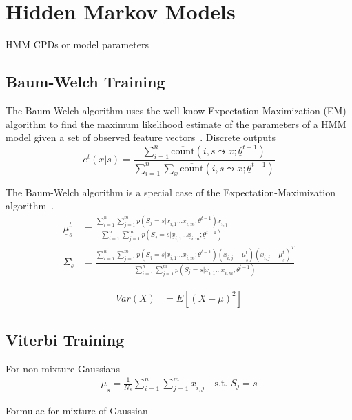 \chapter{Hidden Markov Models}\label{app:hmm}
HMM CPDs or model parameters

\section{Baum-Welch Training}
The Baum-Welch algorithm uses the well know Expectation Maximization (EM)
algorithm to find the maximum likelihood estimate of the parameters of a
HMM model given a set of observed feature vectors~\cite{baum-welch14}. Discrete
outputs
\begin{equation}
e^t(x|s) = \frac{\sum_{i=1}^n \overline{\text{count}}(i, s\leadsto x;
\underline{\theta}^{t-1})}{\sum_{i=1}^n \sum_x \overline{\text{count}}(i,
s\leadsto x;
\underline{\theta}^{t-1})}
\end{equation}

The Baum-Welch algorithm is a special case of the Expectation-Maximization
algorithm~\cite{jurafsky07}.
\begin{align}
\underline{\mu}_s^t &= \frac{\sum_{i=1}^n\sum_{j=1}^m p(S_j = s |
\underline{x}_{i, 1}\ldots\underline{x}_{i,
m};\underline{\theta}^{t-1})\underline{x}_{i, j}}{\sum_{i=1}^n\sum_{j=1}^m p(S_j = s | \underline{x}_{i, 1}\ldots\underline{x}_{i, m};\underline{\theta}^{t-1})} \\
\Sigma_s^t &= \frac{\sum_{i=1}^n\sum_{j=1}^m p(S_j = s |
\underline{x}_{i, 1}\ldots\underline{x}_{i,
m};\underline{\theta}^{t-1})(\underline{x}_{i, j} -
\underline{\mu}_s^t)(\underline{x}_{i, j} -
\underline{\mu}_s^t)^T}{\sum_{i=1}^n\sum_{j=1}^m p(S_j = s | \underline{x}_{i,
1}\ldots\underline{x}_{i, m};\underline{\theta}^{t-1})}
\end{align}

\begin{eqnarray}
Var(X) &= E[(X - \mu)^2]
\end{eqnarray}

\section{Viterbi Training}
For non-mixture Gaussians
\begin{eqnarray}
\underline{\mu}_s = \frac{1}{N_s}\sum_{i=1}^n\sum_{j=1}^m\underline{x}_{i,j}
\quad \text{s.t. } S_j = s
\end{eqnarray}

Formulae for mixture of Gaussian

